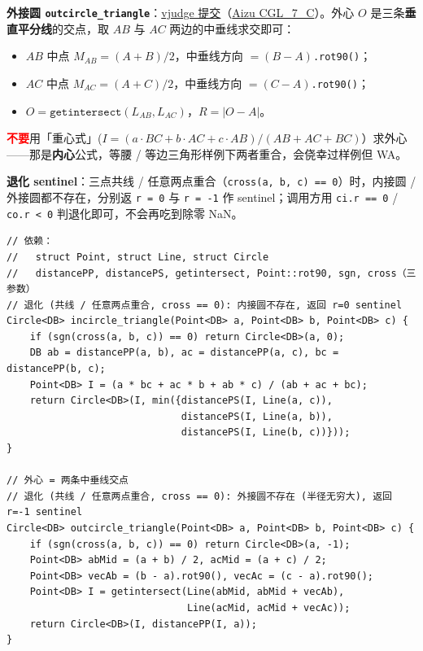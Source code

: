 		\textbf{外接圆 \texttt{outcircle\_triangle}}：\href{https://vjudge.net/solution/69927652}{vjudge 提交}（\href{https://vjudge.net/problem/Aizu-CGL_7_C}{Aizu CGL\_7\_C}）。外心 $O$ 是三条\textbf{垂直平分线}的交点，取 $AB$ 与 $AC$ 两边的中垂线求交即可：
		\begin{itemize}
			\setlength\itemsep{0pt}
			\item $AB$ 中点 $M_{AB} = (A + B) / 2$，中垂线方向 $= (B - A)$\texttt{.rot90()}；
			\item $AC$ 中点 $M_{AC} = (A + C) / 2$，中垂线方向 $= (C - A)$\texttt{.rot90()}；
			\item $O = \texttt{getintersect}(L_{AB}, L_{AC})$，$R = |O - A|$。
		\end{itemize}

		\textcolor{red}{\textbf{不要}}用「重心式」($I = (a \cdot BC + b \cdot AC + c \cdot AB)/(AB+AC+BC)$）求外心——那是\textbf{内心}公式，等腰 / 等边三角形样例下两者重合，会侥幸过样例但 WA。

		\textbf{退化 sentinel}：三点共线 / 任意两点重合（\texttt{cross(a, b, c) == 0}）时，内接圆 / 外接圆都不存在，分别返 \texttt{r = 0} 与 \texttt{r = -1} 作 sentinel；调用方用 \texttt{ci.r == 0} / \texttt{co.r < 0} 判退化即可，不会再吃到除零 NaN。

		\begin{verbatim}
// 依赖：
//   struct Point, struct Line, struct Circle
//   distancePP, distancePS, getintersect, Point::rot90, sgn, cross（三参数）
// 退化 (共线 / 任意两点重合, cross == 0): 内接圆不存在, 返回 r=0 sentinel
Circle<DB> incircle_triangle(Point<DB> a, Point<DB> b, Point<DB> c) {
	if (sgn(cross(a, b, c)) == 0) return Circle<DB>(a, 0);
	DB ab = distancePP(a, b), ac = distancePP(a, c), bc = distancePP(b, c);
	Point<DB> I = (a * bc + ac * b + ab * c) / (ab + ac + bc);
	return Circle<DB>(I, min({distancePS(I, Line(a, c)),
	                          distancePS(I, Line(a, b)),
	                          distancePS(I, Line(b, c))}));
}

// 外心 = 两条中垂线交点
// 退化 (共线 / 任意两点重合, cross == 0): 外接圆不存在 (半径无穷大), 返回 r=-1 sentinel
Circle<DB> outcircle_triangle(Point<DB> a, Point<DB> b, Point<DB> c) {
	if (sgn(cross(a, b, c)) == 0) return Circle<DB>(a, -1);
	Point<DB> abMid = (a + b) / 2, acMid = (a + c) / 2;
	Point<DB> vecAb = (b - a).rot90(), vecAc = (c - a).rot90();
	Point<DB> I = getintersect(Line(abMid, abMid + vecAb),
	                           Line(acMid, acMid + vecAc));
	return Circle<DB>(I, distancePP(I, a));
}
		\end{verbatim}

